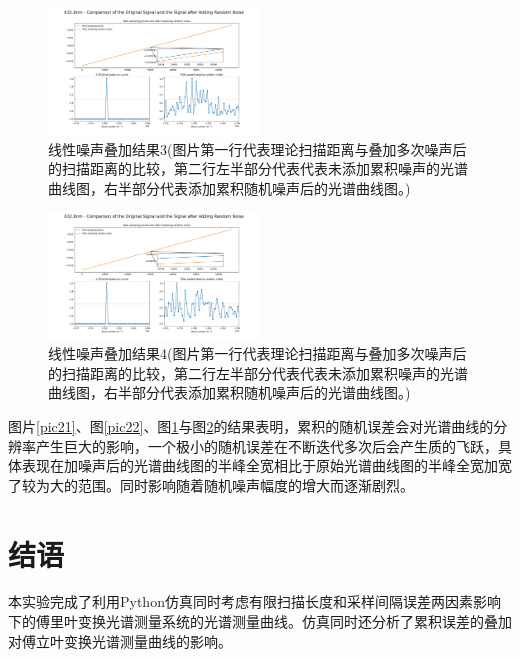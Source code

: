 \documentclass[conference]{IEEEtran}
\begin{document}
\begin{figure}[htbp]
    \centerline{\includegraphics[width=0.5\textwidth]{随机噪声叠加3.png}}
    \caption{线性噪声叠加结果3(图片第一行代表理论扫描距离与叠加多次噪声后的扫描距离的比较，第二行左半部分代表代表未添加累积噪声的光谱曲线图，右半部分代表添加累积随机噪声后的光谱曲线图。)}
    \label{pic23}
\end{figure}

\begin{figure}[htbp]
    \centerline{\includegraphics[width=0.5\textwidth]{随机噪声叠加4.png}}
    \caption{线性噪声叠加结果4(图片第一行代表理论扫描距离与叠加多次噪声后的扫描距离的比较，第二行左半部分代表代表未添加累积噪声的光谱曲线图，右半部分代表添加累积随机噪声后的光谱曲线图。)}
    \label{pic24}
\end{figure}

图片\ref{pic21}、图\ref{pic22}、图\ref{pic23}与图\ref{pic24}的结果表明，累积的随机误差会对光谱曲线的分辨率产生巨大的影响，一个极小的随机误差在不断迭代多次后会产生质的飞跃，具体表现在加噪声后的光谱曲线图的半峰全宽相比于原始光谱曲线图的半峰全宽加宽了较为大的范围。同时影响随着随机噪声幅度的增大而逐渐剧烈。

\section{结语}
本实验完成了利用Python仿真同时考虑有限扫描长度和采样间隔误差两因素影响下的傅里叶变换光谱测量系统的光谱测量曲线。仿真同时还分析了累积误差的叠加对傅立叶变换光谱测量曲线的影响。
\end{document}
